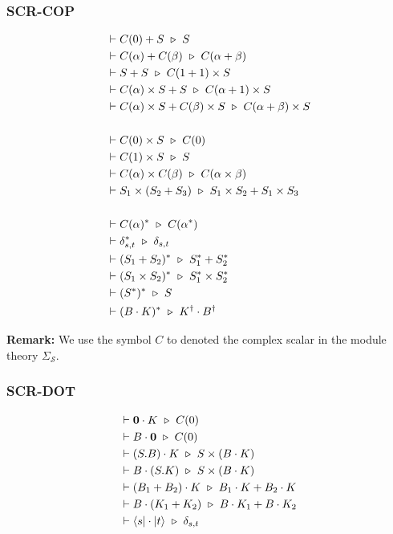 \subsubsection*{\textsf{SCR-COP}}
\begin{align*}
  & \vdash C(0) + S \ \triangleright\  S \\
  & \vdash C(\alpha) + C(\beta) \ \triangleright\  C(\alpha + \beta) \\
  & \vdash S + S \ \triangleright\  C(1 + 1) \times S \\
  & \vdash C(\alpha) \times S + S \ \triangleright\  C(\alpha + 1) \times S \\
  & \vdash C(\alpha) \times S + C(\beta) \times S \ \triangleright\  C(\alpha + \beta) \times S
  \\
  \\
  & \vdash C(0) \times S \ \triangleright\  C(0) \\
  & \vdash C(1) \times S \ \triangleright\  S \\
  & \vdash C(\alpha) \times C(\beta) \ \triangleright\  C(\alpha \times \beta) \\
  & \vdash S_1 \times (S_2 + S_3) \ \triangleright\  S_1 \times S_2 + S_1 \times S_3
  \\
  \\
  & \vdash C(\alpha)^* \ \triangleright\  C(\alpha^*) \\
  & \vdash \delta_{s, t}^* \ \triangleright\  \delta_{s, t} \\
  & \vdash (S_1 + S_2)^* \ \triangleright\  S_1^* + S_2^* \\
  & \vdash (S_1 \times S_2)^* \ \triangleright\  S_1^* \times S_2^* \\
  & \vdash (S^*)^* \ \triangleright\  S \\
  & \vdash (B \cdot K)^* \ \triangleright\  K^\dagger \cdot B^\dagger
\end{align*}

\textbf{Remark: } We use the symbol $C$ to denoted the complex scalar in the module theory $\Sigma_\mathcal{S}$.



\subsubsection*{\textsf{SCR-DOT}}
\begin{align*}
  & \vdash \mathbf{0} \cdot K \ \triangleright\  C(0) \\
  & \vdash B \cdot \mathbf{0} \ \triangleright\  C(0) \\
  & \vdash (S.B) \cdot K \ \triangleright\  S \times (B \cdot K) \\
  & \vdash B \cdot (S.K) \ \triangleright\  S \times (B \cdot K) \\
  & \vdash (B_1 + B_2) \cdot K \ \triangleright\  B_1 \cdot K + B_2 \cdot K \\
  & \vdash B \cdot (K_1 + K_2) \ \triangleright\  B \cdot K_1 + B \cdot K_2 \\
  & \vdash \langle s| \cdot |t\rangle \ \triangleright\  \delta_{s, t} \\
\end{align*}

